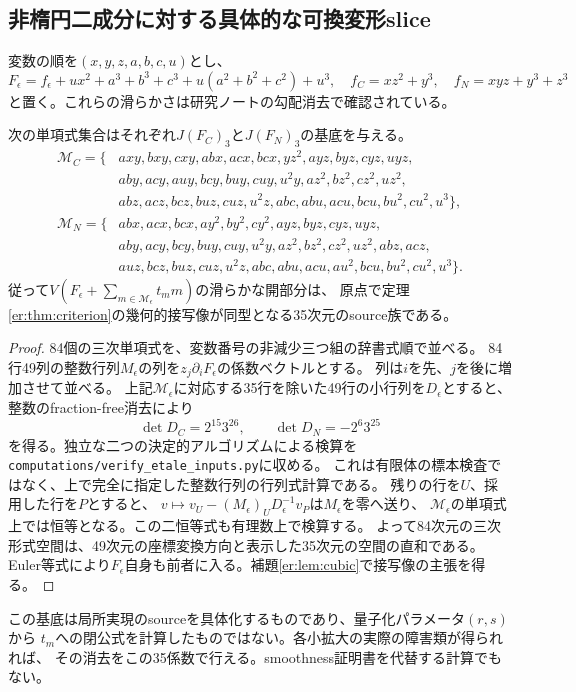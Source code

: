 \subsection{非楕円二成分に対する具体的な可換変形slice}
変数の順を$(x,y,z,a,b,c,u)$とし、
\[
 F_\epsilon=f_\epsilon+ux^2+a^3+b^3+c^3+u(a^2+b^2+c^2)+u^3,
 \quad f_C=xz^2+y^3,\quad f_N=xyz+y^3+z^3
\]
と置く。これらの滑らかさは研究ノートの勾配消去で確認されている。
\begin{proposition}\label{RSRer:prop:slice}
次の単項式集合はそれぞれ$J(F_C)_3$と$J(F_N)_3$の基底を与える。
\begin{align*}
\mathcal M_C=\{&axy,bxy,cxy,abx,acx,bcx,yz^2,ayz,byz,cyz,uyz,\\
 &aby,acy,auy,bcy,buy,cuy,u^2y,az^2,bz^2,cz^2,uz^2,\\
 &abz,acz,bcz,buz,cuz,u^2z,abc,abu,acu,bcu,bu^2,cu^2,u^3\},\\
\mathcal M_N=\{&abx,acx,bcx,ay^2,by^2,cy^2,ayz,byz,cyz,uyz,\\
 &aby,acy,bcy,buy,cuy,u^2y,az^2,bz^2,cz^2,uz^2,abz,acz,\\
 &auz,bcz,buz,cuz,u^2z,abc,abu,acu,au^2,bcu,bu^2,cu^2,u^3\}.
\end{align*}
従って$V(F_\epsilon+\sum_{m\in\mathcal M_\epsilon}t_m m)$の滑らかな開部分は、
原点で定理\ref{er:thm:criterion}の幾何的接写像が同型となる35次元のsource族である。
\end{proposition}
\begin{proof}
84個の三次単項式を、変数番号の非減少三つ組の辞書式順で並べる。
84行49列の整数行列$M_\epsilon$の列を$z_j\partial_iF_\epsilon$の係数ベクトルとする。
列は$i$を先、$j$を後に増加させて並べる。
上記$\mathcal M_\epsilon$に対応する35行を除いた49行の小行列を$D_\epsilon$とすると、
整数のfraction-free消去により
\[
 \det D_C=2^{15}3^{26},\qquad \det D_N=-2^6 3^{25}
\]
を得る。独立な二つの決定的アルゴリズムによる検算を
\texttt{computations/verify\_etale\_inputs.py}に収める。
これは有限体の標本検査ではなく、上で完全に指定した整数行列の行列式計算である。
残りの行を$U$、採用した行を$P$とすると、
$v\mapsto v_U-(M_\epsilon)_U D_\epsilon^{-1}v_P$は$M_\epsilon$を零へ送り、
$\mathcal M_\epsilon$の単項式上では恒等となる。この二恒等式も有理数上で検算する。
よって84次元の三次形式空間は、49次元の座標変換方向と表示した35次元の空間の直和である。
Euler等式により$F_\epsilon$自身も前者に入る。補題\ref{er:lem:cubic}で接写像の主張を得る。
\end{proof}

\begin{remark}
この基底は局所実現のsourceを具体化するものであり、量子化パラメータ$(r,s)$から
$t_m$への閉公式を計算したものではない。各小拡大の実際の障害類が得られれば、
その消去をこの35係数で行える。smoothness証明書を代替する計算でもない。
\end{remark}

